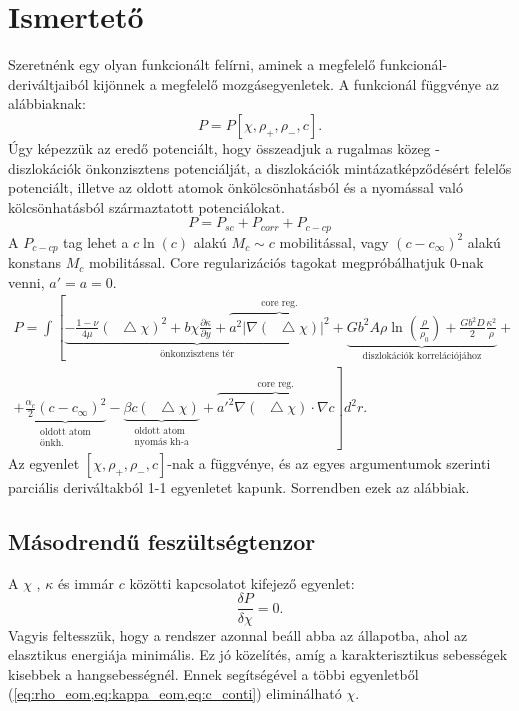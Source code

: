 \documentclass[10pt,a4paper]{scrartcl}
\newcommand*\Laplace{\mathop{}\!\mathbin\bigtriangleup}
\begin{document}
\tableofcontents

\section{Ismertető}
Szeretnénk egy olyan funkcionált felírni, aminek a megfelelő funkcionál-deriváltjaiból kijönnek a megfelelő mozgásegyenletek. A funkcionál függvénye az alábbiaknak:
\[P=P\left[ {\chi ,{\rho _ + },{\rho _ - },c} \right].\]
Úgy képezzük az eredő potenciált, hogy összeadjuk a rugalmas közeg - diszlokációk önkonzisztens potenciálját, a diszlokációk mintázatképződésért felelős potenciált, illetve az oldott atomok önkölcsönhatásból és a nyomással való kölcsönhatásból származtatott potenciálokat.
\[P = {P_{sc}} + {P_{corr}} + {P_{c - cp}}\]
A $P_{c - cp}$ tag lehet a $c\ln \left( c \right)$ alakú $M_c \sim c$ mobilitással, vagy ${\left( {c - {c_\infty }} \right)^2}$ alakú konstans $M_c$ mobilitással. Core regularizációs tagokat megpróbálhatjuk 0-nak venni, $a' = a = 0$.
\begin{multline} \label{eq:plastic_pot}
P = \int \left[ \underbrace { - \frac{{1 - \nu }}{{4\mu }}{{\left( {\Laplace \chi } \right)}^2} + b\chi \frac{\partial \kappa}{\partial y} + \overbrace{a^2\left| {\nabla \left( \Laplace \chi  \right)} \right|^2}^{\text{core reg.}}}_{{\text{önkonzisztens tér}}} + \underbrace {G{b^2}A\rho \ln \left( {\frac{\rho }{{{\rho _0}}}} \right) + \frac{{G{b^2}D}}{2}\frac{{{\kappa ^2}}}{\rho }}_{{\text{diszlokációk korrelációjához}}} + \right. \\ 
\left. + \underbrace {\frac{\alpha_c}{2} {{\left( {c - {c_\infty }} \right)}^2}}_{\substack{\text{oldott atom}\\\text{önkh.}}} - \underbrace {\beta c\left( {\Laplace \chi } \right)}_{\substack{\text{oldott atom}\\\text{nyomás kh-a}}} + \overbrace {a{'^2}\nabla \left( \Laplace \chi  \right) \cdot \nabla c}^{{\text{core reg.}}}\right] {d^2}r.
\end{multline}
Az egyenlet $\left[ {\chi ,{\rho _ + },{\rho _ - },c} \right]$-nak a függvénye, és az egyes argumentumok szerinti parciális deriváltakból 1-1 egyenletet kapunk. Sorrendben ezek az alábbiak.
\subsection{Másodrendű feszültségtenzor}
A $\chi$ , $\kappa$ és immár $c$ közötti kapcsolatot kifejező egyenlet: 
\begin{equation}
\frac{{\delta P}}{{\delta \chi }} = 0.
\end{equation}
Vagyis feltesszük, hogy a rendszer azonnal beáll abba az állapotba, ahol az elasztikus energiája minimális. Ez jó közelítés, amíg a karakterisztikus sebességek kisebbek a hangsebességnél. Ennek segítségével a többi egyenletből (\cref{eq:rho_eom,eq:kappa_eom,eq:c_conti}) eliminálható $\chi$.
\end{document}
